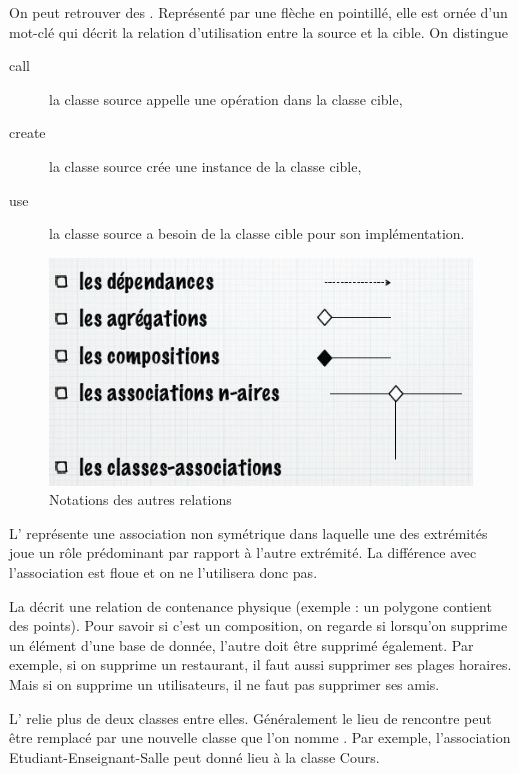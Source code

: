 On peut retrouver des .
Représenté par une flèche en pointillé,
elle est ornée d'un mot-clé qui décrit la relation
d'utilisation entre la source et la cible.
On distingue
\begin{description}
  \item[call]
    la classe source appelle une opération dans la classe cible,
  \item[create]
    la classe source crée une instance de la classe cible,
  \item[use]
    la classe source a besoin de la classe cible pour son implémentation.
\end{description}

\begin{figure}[h]
  \centering
  \includegraphics[scale=0.6]{diagramme_classes_relations}
  \caption{Notations des autres relations}
  \label{diagramme_classes_relations}
\end{figure}

L' représente une association non symétrique dans laquelle
une des extrémités joue un rôle prédominant par rapport à l'autre extrémité.
La différence avec l'association est floue et on ne l'utilisera donc pas.

La  décrit une relation de contenance
physique (exemple : un polygone contient des points).
Pour savoir si c'est un composition, on regarde si lorsqu'on supprime
un élément d'une base de donnée, l'autre doit être supprimé également.
Par exemple, si on supprime un restaurant, il faut aussi supprimer
ses plages horaires.
Mais si on supprime un utilisateurs, il ne faut pas supprimer ses amis.

L' relie plus de deux classes entre elles.
Généralement le lieu de rencontre peut être remplacé par une nouvelle
classe que l'on nomme .
Par exemple,
l'association Etudiant-Enseignant-Salle peut donné lieu à la classe Cours.

